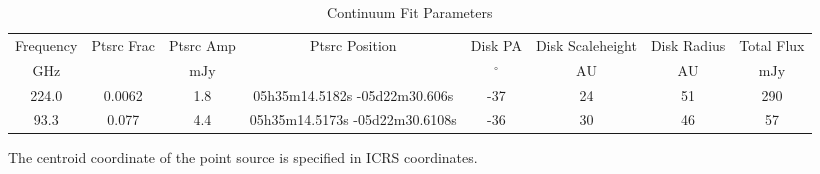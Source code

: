 \begin{table*}[htp]
\centering
\caption{Continuum Fit Parameters}
\begin{tabular}{cccccccc}
\label{tab:continuum_fit_parameters}
Frequency & Ptsrc Frac & Ptsrc Amp & Ptsrc Position & Disk PA & Disk Scaleheight & Disk Radius & Total Flux \\
$\mathrm{GHz}$ & $\mathrm{}$ & $\mathrm{mJy}$ &  & $\mathrm{{}^{\circ}}$ & $\mathrm{AU}$ & $\mathrm{AU}$ & $\mathrm{mJy}$ \\
\hline
224.0 & 0.0062 & 1.8 & 05h35m14.5182s -05d22m30.606s & -37 & 24 & 51 & 290 \\
93.3 & 0.077 & 4.4 & 05h35m14.5173s -05d22m30.6108s & -36 & 30 & 46 & 57 \\
\hline
\end{tabular}

\par The centroid coordinate of the point source is specified in ICRS coordinates.
\end{table*}
